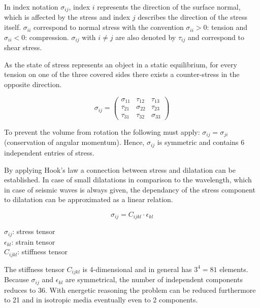 \documentclass[pdftex,a4paper,parskip,listof=totoc,bibliography=totoc,onehalfspacing,12pt]{scrreprt}
\begin{document}
In index notation $\sigma_{ij}$, index $i$ represents the direction of the surface normal, which is affected by the stress and index $j$ describes the direction of the stress itself. $\sigma_{ii}$ correspond to normal stress with the convention $\sigma_{ii} > 0$: tension and $\sigma_{ii} < 0$: compression. $\sigma_{ij}$ with  $i \neq j$ are also denoted by $\tau_{ij}$ and correspond to shear stress. 

As the state of stress represents an object in a static equilibrium, for every tension on one of the three covered sides there exists a counter-stress in the opposite direction. 

\begin{minipage}[t]{0.4\textwidth}
\begin{equation}
	\sigma_{ij}=\left(
\begin{array}{ccc}
\sigma_{11} & \tau_{12} & \tau_{13}\\
\tau_{21} & \sigma_{22} & \tau_{23}\\
\tau_{31} & \tau_{32} & \sigma_{33}
\end{array}
\right)
\end{equation}
\end{minipage}
\hfill
\begin{minipage}[t]{0.45\textwidth}
To prevent the volume from rotation the following must apply: $\sigma_{ij} = \sigma_{ji}$ (conservation of angular momentum). Hence, $\sigma_{ij}$ is symmetric and contains \num{6} independent entries of stress.
\end{minipage}

By applying Hook's law a connection between stress and dilatation  can be established. In case of small dilatations in comparison to the wavelength, which in case of seismic waves is always given, the dependancy of the stress component to dilatation can be approximated as a linear relation.
\begin{minipage}[t]{0.4\textwidth}
\begin{equation}
	\sigma_{ij} = C_{ijkl} \cdot\epsilon_{kl}
\end{equation}
\end{minipage}
\hfill
\begin{minipage}[t]{0.45\textwidth}
$\sigma_{ij}$: stress tensor\\
$\epsilon_{kl}$: strain tensor\\
$C_{ijkl}$: stiffness tensor
\end{minipage}
The stiffness tensor $C_{ijkl}$ is \num{4}-dimensional and in general has $3^4 = 81$ elements. Because $\sigma_{ij}$ and $\epsilon_{kl}$ are symmetrical, the number of independent components reduces to \num{36}. With energetic reasoning the problem can be reduced furthermore to \num{21} and in isotropic media eventually even to \num{2} components. 
\end{document}
